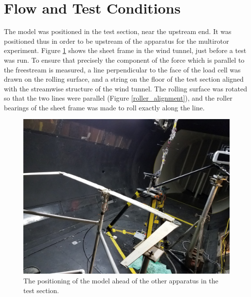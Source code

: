 \documentclass[12pt]{report} %
\begin{document}
\section{Flow and Test Conditions}
The model was positioned in the test section, near the upstream end. It was positioned thus in order to be upstream of the apparatus
for the multirotor experiment. Figure \ref{positioning} shows the sheet frame in the wind tunnel, just before a test was run. To ensure
that precisely the component of the force which is parallel to the freestream is measured, a line perpendicular to the face of the load
cell was drawn on the rolling surface, and a string on the floor of the test section aligned with the streamwise structure of the wind
tunnel. The rolling surface was rotated so that the two lines were parallel (Figure \ref{roller_alignment}), and the roller bearings
of the sheet frame was made to roll
exactly along the line.

\begin{figure}
\includegraphics[width = 0.7\linewidth]{frame_in_tunnel.jpg}
\centering
\caption{The positioning of the model ahead of the other apparatus in the test section.}
\label{positioning}
\end{figure}
\end{document}
